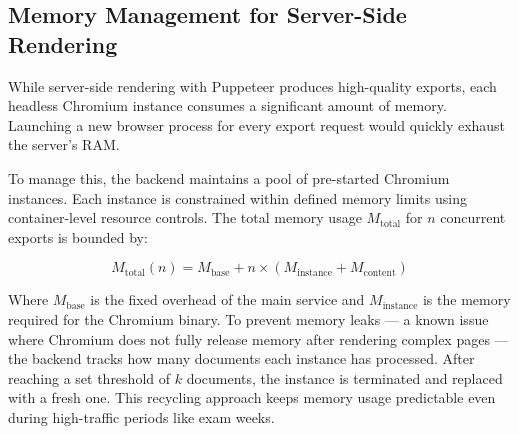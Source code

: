 \subsection{Memory Management for Server-Side Rendering}
While server-side rendering with Puppeteer produces high-quality exports, each headless Chromium instance consumes a significant amount of memory. Launching a new browser process for every export request would quickly exhaust the server's RAM.

To manage this, the backend maintains a pool of pre-started Chromium instances. Each instance is constrained within defined memory limits using container-level resource controls. The total memory usage $M_{\text{total}}$ for $n$ concurrent exports is bounded by:

\begin{equation}
    M_{\text{total}}(n) = M_{\text{base}} + n \times (M_{\text{instance}} + M_{\text{content}})
\end{equation}

Where $M_{\text{base}}$ is the fixed overhead of the main service and $M_{\text{instance}}$ is the memory required for the Chromium binary. To prevent memory leaks — a known issue where Chromium does not fully release memory after rendering complex pages — the backend tracks how many documents each instance has processed. After reaching a set threshold of $k$ documents, the instance is terminated and replaced with a fresh one. This recycling approach keeps memory usage predictable even during high-traffic periods like exam weeks.